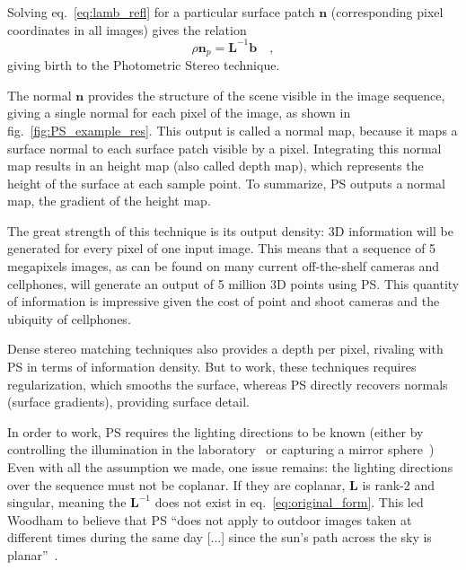 Solving eq.~\eqref{eq:lamb_refl} for a particular surface patch $\mathbf{n}$ (corresponding pixel coordinates in all images) gives the relation
\begin{equation}
\label{eq:original_form}
\rho \mathbf{n}_p =  \mathbf{L}^{-1} \mathbf{b} \quad,
\end{equation}
giving birth to the Photometric Stereo technique.

The normal $\mathbf{n}$ provides the structure of the scene visible in the image sequence, giving a single normal for each pixel of the image, as shown in fig.~\ref{fig:PS_example_res}. This output is called a normal map, because it maps a surface normal to each surface patch visible by a pixel. Integrating this normal map results in an height map (also called depth map), which represents the height of the surface at each sample point. To summarize, PS outputs a normal map, the gradient of the height map.

The great strength of this technique is its output density: 3D information will be generated for every pixel of one input image. This means that a sequence of 5 megapixels images, as can be found on many current off-the-shelf cameras and cellphones, will generate an output of 5 million 3D points using PS. This quantity of information is impressive given the cost of point and shoot cameras and the ubiquity of cellphones.

Dense stereo matching techniques also provides a depth per pixel, rivaling with PS in terms of information density. But to work, these techniques requires regularization, which smooths the surface, whereas PS directly recovers normals (surface gradients), providing surface detail.

In order to work, PS requires the lighting directions to be known (either by controlling the illumination in the laboratory~\cite{Woodham1979,Ikeuchi1981} or capturing a mirror sphere~\cite{inose-tcva-13,hung-wacv-15,ikehata-cvpr-14,oxholm-eccv-12,ikehata-cvpr-12,Ackermann2012a,Lu2012,shi-cvpr-10,yu-iccp-13,shi-3dv-14}) Even with all the assumption we made, one issue remains: the lighting directions over the sequence must not be coplanar. If they are coplanar, $\mathbf{L}$ is rank-2 and singular, meaning the $\mathbf{L}^{-1}$ does not exist in eq.~\ref{eq:original_form}. This led Woodham to believe that PS ``does not apply to outdoor images taken at different times during the same day [...] since the sun's path across the sky is planar''~\cite{Woodham1979}.


